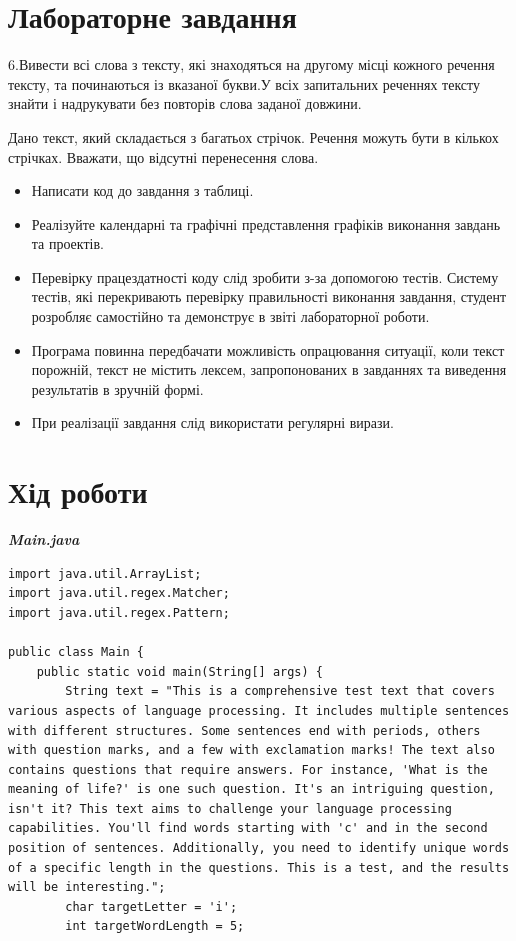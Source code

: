 \documentclass[14pt]{extreport}
\begin{document}
\begin{normalsize}
	\section*{Лабораторне завдання}
	6.Вивести всі слова з тексту, які знаходяться на другому місці
	кожного речення тексту, та починаються із вказаної букви.У
	всіх запитальних реченнях тексту знайти і надрукувати без
	повторів слова заданої довжини.
	
	
	Дано текст, який складається з багатьох стрічок. Речення можуть бути в кількох
	стрічках. Вважати, що відсутні перенесення слова.
	\begin{itemize}
		\item Написати код до завдання з таблиці.
		\item Реалізуйте календарні та графічні представлення графіків виконання завдань та проектів.
		\item Перевірку працездатності коду слід зробити з-за допомогою тестів.
		Систему тестів, які перекривають перевірку правильності виконання
		завдання, студент розробляє самостійно та демонструє в звіті лабораторної
		роботи.
		\item Програма повинна передбачати можливість опрацювання ситуації, коли
		текст порожній, текст не містить лексем, запропонованих в завданнях та
		виведення результатів в зручній формі.
		\item При реалізації завдання слід використати регулярні вирази.
	\end{itemize}
	\section*{Хід роботи}

	\textbf{\textit{Main.java}}
	\begin{lstlisting}
import java.util.ArrayList;
import java.util.regex.Matcher;
import java.util.regex.Pattern;

public class Main {
	public static void main(String[] args) {
		String text = "This is a comprehensive test text that covers various aspects of language processing. It includes multiple sentences with different structures. Some sentences end with periods, others with question marks, and a few with exclamation marks! The text also contains questions that require answers. For instance, 'What is the meaning of life?' is one such question. It's an intriguing question, isn't it? This text aims to challenge your language processing capabilities. You'll find words starting with 'c' and in the second position of sentences. Additionally, you need to identify unique words of a specific length in the questions. This is a test, and the results will be interesting.";
		char targetLetter = 'i';
		int targetWordLength = 5;
		

\end{lstlisting}
\end{normalsize}
\end{document}
